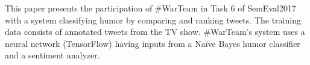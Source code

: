 This paper presents the participation of \#WarTeam in Task 6 of SemEval2017 with a system classifying humor by comparing and ranking tweets. The training data consists of annotated tweets from the \@midnight TV show. \#WarTeam's system uses a neural network (TensorFlow) having inputs from a Naïve Bayes humor classifier and a sentiment analyzer.
